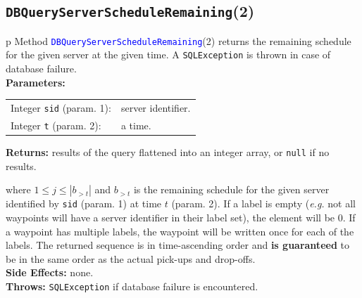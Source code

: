 \subsection{\texttt{DBQueryServerScheduleRemaining}(2)}
\begin{tabular}{p{\textwidth}}
\toprule
{}
Method \textcolor{blue}{{\tt{}\protect{}DBQueryServerScheduleRemaining}}(2) returns the
remaining schedule for the given server at the given time.
A {\tt{}SQLException} is thrown in case of database failure.\\
\midrule
\textbf{Parameters:} \\
\begin{tabular}{lp{116mm}}
Integer {\tt{}sid} (param. 1):&server identifier.\\
Integer {\tt{}t} (param. 2):&a time.\\
\end{tabular}
\textbf{Returns:} results of the query flattened into an integer array,
or {\tt{}null} if no results.


where $1\leq j\leq |b_{>t}|$ and $b_{>t}$ is the remaining schedule for the
given server identified by {\tt{}sid} (param. 1) at time $t$ (param. 2).
If a label is empty (\textit{e.g.} not all waypoints will have a server
identifier in their label set), the element will be 0. If a waypoint has
multiple labels, the waypoint will be written once for each of the labels.
The returned sequence is in time-ascending order and \textbf{is guaranteed}
to be in the same order as the actual pick-ups and drop-offs.\\
\textbf{Side Effects:} none.\\
\textbf{Throws:} {\tt{}SQLException} if database failure is encountered.\\
\bottomrule
\end{tabular}
\nwenddocs{}\endmoddef{}
